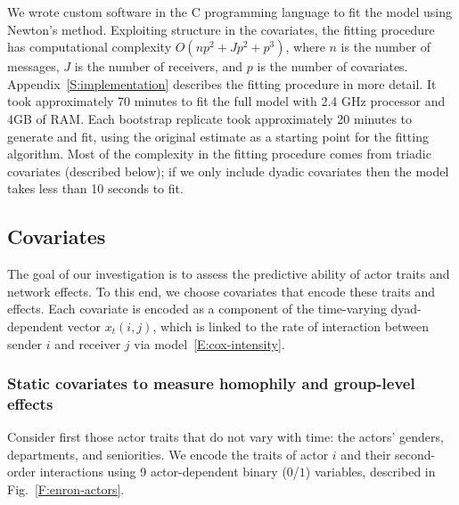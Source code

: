 \documentclass[final]{statsoc}
\begin{document}
We wrote custom software in the C programming language to fit the model using
Newton's method.  Exploiting structure in the covariates, the fitting
procedure has computational complexity $O(n p^2 + J p^2 + p^3)$, where $n$ is
the number of messages, $J$ is the number of receivers, and $p$ is the number
of covariates.  Appendix~\ref{S:implementation} describes the fitting
procedure in more detail.  It took approximately 70 minutes to fit the full
model with 2.4 GHz processor and 4GB of RAM.  Each bootstrap replicate took
approximately 20 minutes to generate and fit, using the original estimate as a
starting point for the fitting algorithm.  Most of the complexity in the
fitting procedure comes from triadic covariates (described below); if we only
include dyadic covariates then the model takes less than 10 seconds to fit.  



\subsection{Covariates}\label{S:enron-covariates}

The goal of our investigation is to assess the predictive ability of actor traits and network effects.  To this end, we choose covariates that encode these traits and effects.  Each covariate is encoded as a component of the time-varying dyad-dependent vector $x_t(i,j)$, which is linked to the rate of interaction between sender $i$ and receiver $j$ via model~\eqref{E:cox-intensity}.

\subsubsection{Static covariates to measure homophily and group-level effects}

Consider first those actor traits that do not vary with time: the actors'
genders, departments, and seniorities.  We encode the traits of actor $i$ and
their second-order interactions using 9 actor-dependent binary ($0$/$1$)
variables, described in Fig.~\ref{F:enron-actors}.
\end{document}
